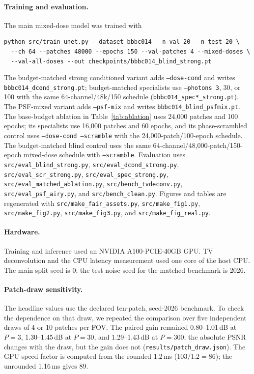 \documentclass[11pt]{article}
\begin{document}
\paragraph{Training and evaluation.}
The main mixed-dose model was trained with
\begin{verbatim}
python src/train_unet.py --dataset bbbc014 --n-val 20 --n-test 20 \
  --ch 64 --patches 48000 --epochs 150 --val-patches 4 --mixed-doses \
  --val-all-doses --out checkpoints/bbbc014_blind_strong.pt
\end{verbatim}
The budget-matched strong conditioned variant adds \texttt{--dose-cond} and
writes \texttt{bbbc014\_dcond\_strong.pt}; budget-matched specialists use
\texttt{--photons 3}, 30, or 100 with the same 64-channel/48k/150 schedule
(\texttt{bbbc014\_spec*\_strong.pt}). The PSF-mixed variant adds
\texttt{--psf-mix} and writes \texttt{bbbc014\_blind\_psfmix.pt}. The
base-budget ablation in Table~\ref{tab:ablation} uses 24{,}000 patches and 100
epochs; its specialists use 16{,}000 patches and 60 epochs, and its
phase-scrambled control uses \texttt{--dose-cond --scramble} with the
24{,}000-patch/100-epoch schedule. The budget-matched blind control uses the
same 64-channel/48{,}000-patch/150-epoch mixed-dose schedule with
\texttt{--scramble}. Evaluation
uses \texttt{src/eval\_blind\_strong.py}, \texttt{src/eval\_dcond\_strong.py},
\texttt{src/eval\_scr\_strong.py}, \texttt{src/eval\_spec\_strong.py},
\texttt{src/eval\_matched\_ablation.py}, \texttt{src/bench\_tvdeconv.py},
\texttt{src/eval\_psf\_airy.py}, and \texttt{src/bench\_clean.py}. Figures and tables are regenerated with
\texttt{src/make\_fair\_assets.py}, \texttt{src/make\_fig1.py},
\texttt{src/make\_fig2.py}, \texttt{src/make\_fig3.py}, and
\texttt{src/make\_fig\_real.py}.

\paragraph{Hardware.}
Training and inference used an NVIDIA A100-PCIE-40GB GPU. TV deconvolution and
the CPU latency measurement used one core of the host CPU. The main split seed
is 0; the test noise seed for the matched benchmark is 2026.

\paragraph{Patch-draw sensitivity.}
The headline values use the declared ten-patch, seed-2026 benchmark. To check
the dependence on that draw, we repeated the comparison over five independent
draws of 4 or 10 patches per FOV. The paired gain remained 0.80--1.01\,dB at
$P=3$, 1.30--1.45\,dB at $P=30$, and 1.29--1.43\,dB at $P=300$; the absolute
PSNR changes with the draw, but the gain does not
(\texttt{results/patch\_draw.json}). The GPU speed factor is computed from the
rounded 1.2\,ms ($103/1.2=86$); the unrounded 1.16\,ms gives 89.
\end{document}

